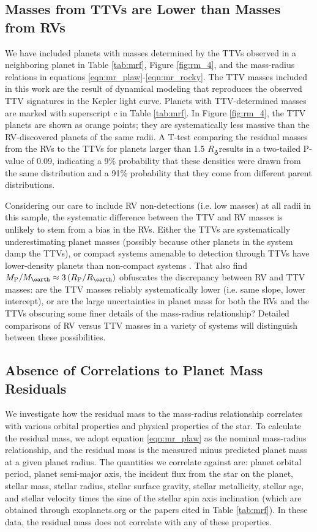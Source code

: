 \documentclass[iop]{emulateapj}
\newcommand{\rpl}{\ensuremath{R_{\rm P}}}
\newcommand{\mpl}{\ensuremath{M_{\rm P}}}
\newcommand{\rearth}{\ensuremath{R_\earth}}
\newcommand{\mearth}{\ensuremath{M_\earth}}
\begin{document}
\subsection{Masses from TTVs are Lower than Masses from RVs}
We have included planets with masses determined by the TTVs observed in a neighboring planet in Table \ref{tab:mrf}, Figure \ref{fig:rm_4}, and the mass-radius relations in equations \ref{eqn:mr_plaw}-\ref{eqn:mr_rocky}.  The TTV masses included in this work are the result of dynamical modeling that reproduces the observed TTV signatures in the Kepler light curve.  Planets with TTV-determined masses are marked with superscript $c$ in Table \ref{tab:mrf}.  In Figure \ref{fig:rm_4}, the TTV planets are shown as orange points; they are systematically less massive than the RV-discovered planets of the same radii.  A T-test comparing the residual masses from the RVs to the TTVs for planets larger than 1.5 \rearth results in a two-tailed P-value of 0.09, indicating a 9\% probability that these densities were drawn from the same distribution and a 91\% probability that they come from different parent distributions.

Considering our care to include RV non-detections (i.e. low masses) at all radii in this sample, the systematic difference between the TTV and RV masses is unlikely to stem from a bias in the RVs.  Either the TTVs are systematically underestimating planet masses (possibly because other planets in the system damp the TTVs), or compact systems amenable to detection through TTVs have lower-density planets than non-compact systems \citep[e.g. the Kepler-11 system][]{Lissauer2013}.  That \citet{WL2013} also find $\mpl/\mearth \approx 3 \left(\rpl/\rearth\right)$ obfuscates the discrepancy between RV and TTV masses: are the TTV masses reliably systematically lower (i.e. same slope, lower intercept), or are the large uncertainties in planet mass for both the RVs and the TTVs obscuring some finer details of the mass-radius relationship?  Detailed comparisons of RV versus TTV masses in a variety of systems will distinguish between these possibilities.

\subsection{Absence of Correlations to Planet Mass Residuals}
We investigate how the residual mass to the mass-radius relationship correlates with various orbital properties and physical properties of the star.  To calculate the residual mass, we adopt equation \ref{eqn:mr_plaw} as the nominal mass-radius relationship, and the residual mass is the measured minus predicted planet mass at a given planet radius.  The quantities we correlate against are: planet orbital period, planet semi-major axis, the incident flux from the star on the planet, stellar mass, stellar radius, stellar surface gravity, stellar metallicity, stellar age, and stellar velocity times the sine of the stellar spin axis inclination (which are obtained through exoplanets.org or the papers cited in Table \ref{tab:mrf}).  In these data, the residual mass does not correlate with any of these properties.
\end{document}
